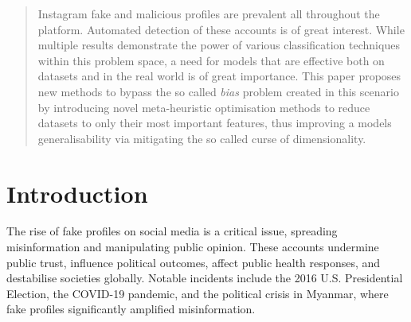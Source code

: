 \documentclass[conference]{IEEEtran}
\begin{document}

\graphicspath{{./figures}}



\maketitle

\begin{abstract}
	Instagram fake and malicious profiles are prevalent all throughout the platform. Automated detection of these accounts is of great interest. While multiple results demonstrate the power of various classification techniques within this problem space, a need for models that are effective both on datasets and in the real world is of great importance. This paper proposes new methods to bypass the so called \textit{bias} problem created in this scenario by introducing novel meta-heuristic optimisation methods to reduce datasets to only their most important features, thus improving a models generalisability via mitigating the so called curse of dimensionality.
\end{abstract}





%
\IEEEpeerreviewmaketitle



\section{Introduction}

The rise of fake profiles on social media is a critical issue, spreading misinformation and manipulating public opinion. These accounts undermine public trust, influence political outcomes, affect public health responses, and destabilise societies globally. Notable incidents include the 2016 U.S. Presidential Election, the COVID-19 pandemic, and the political crisis in Myanmar, where fake profiles significantly amplified misinformation\cite{ZoltanWeigand2023,AlharbiEtAl2022}.
\end{document}
